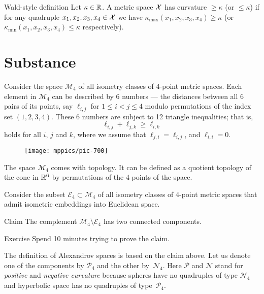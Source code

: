 \begin{thm}{Wald-style definition}
Let $\kappa\in \mathbb{R}$.
A metric space $\mathcal{X}$ has curvature $\ge\kappa$ (or $\le\kappa$) 
if for any quadruple $x_1,x_2,x_3,x_4\in \mathcal{X}$ we have 
$\kappa_{\max}(x_1,x_2,x_3,x_4)\ge \kappa$ (or $\kappa_{\min}(x_1,x_2,x_3,x_4)\le \kappa$ respectively). 
\end{thm}

\section{Substance}\label{sec:manifesto}

Consider the space $\mathcal{M}_4$ of all isometry classes of 4-point metric spaces.
Each element in $\mathcal{M}_4$ can be described by 6 numbers 
 --- the distances between all 6 pairs of its points, say $\ell_{i,j}$ for $1\le i< j\le 4$ modulo permutations of the index set $(1,2,3,4)$.
These 6 numbers are subject to 12 triangle inequalities; that is,
\[\ell_{i,j}+\ell_{j,k}\ge \ell_{i,k}\]
holds for all $i$, $j$ and $k$, where we assume that $\ell_{j,i}=\ell_{i,j}$, and $\ell_{i,i}=0$.

{

\begin{wrapfigure}{o}{33mm}
\vskip-3mm
\centering
\texttt{[image: mppics/pic-700]}
\end{wrapfigure}

The space $\mathcal{M}_4$ comes with topology.
It can be defined as a quotient topology of the cone in $\mathbb{R}^6$ by permutations of the 4 points of the space.

Consider the subset $\mathcal{E}_4\subset \mathcal{M}_4$ of all isometry classes of 4-point metric spaces that admit isometric embeddings into Euclidean space.

}

\begin{thm}{Claim}\label{clm:two-components-of-M4}
The complement $\mathcal{M}_4\setminus \mathcal{E}_4$ has two connected components.
\end{thm}

\begin{thm}{Exercise}
Spend 10 minutes trying to prove the claim.
\end{thm}


The definition of Alexandrov spaces is based on the claim above.
Let us denote one of the components by $\mathcal{P}_4$ and the other by~$\mathcal{N}_4$.
Here $\mathcal{P}$ and $\mathcal{N}$ stand for {}\emph{positive} 
and {}\emph{negative curvature} because spheres have no quadruples of type $\mathcal{N}_4$ and 
hyperbolic space
has no quadruples of type~$\mathcal{P}_4$.

